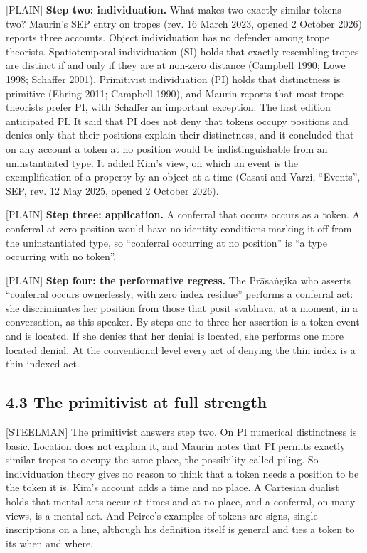 \documentclass[11pt]{article}
\newcommand{\register}[1]{{\ttfamily\small #1}}
\begin{document}
\register{[PLAIN]} \textbf{Step two: individuation.} What makes two exactly similar tokens two? Maurin's SEP entry on tropes (rev. 16 March 2023, opened 2 October 2026) reports three accounts. Object individuation has no defender among trope theorists. Spatiotemporal individuation (SI) holds that exactly resembling tropes are distinct if and only if they are at non-zero distance (Campbell 1990; Lowe 1998; Schaffer 2001). Primitivist individuation (PI) holds that distinctness is primitive (Ehring 2011; Campbell 1990), and Maurin reports that most trope theorists prefer PI, with Schaffer an important exception. The first edition anticipated PI. It said that PI does not deny that tokens occupy positions and denies only that their positions explain their distinctness, and it concluded that on any account a token at no position would be indistinguishable from an uninstantiated type. It added Kim's view, on which an event is the exemplification of a property by an object at a time (Casati and Varzi, ``Events'', SEP, rev. 12 May 2025, opened 2 October 2026).

\register{[PLAIN]} \textbf{Step three: application.} A conferral that occurs occurs as a token. A conferral at zero position would have no identity conditions marking it off from the uninstantiated type, so ``conferral occurring at no position'' is ``a type occurring with no token''.

\register{[PLAIN]} \textbf{Step four: the performative regress.} The Prāsaṅgika who asserts ``conferral occurs ownerlessly, with zero index residue'' performs a conferral act: she discriminates her position from those that posit svabhāva, at a moment, in a conversation, as this speaker. By steps one to three her assertion is a token event and is located. If she denies that her denial is located, she performs one more located denial. At the conventional level every act of denying the thin index is a thin-indexed act.

\subsection*{4.3 The primitivist at full strength}

\register{[STEELMAN]} The primitivist answers step two. On PI numerical distinctness is basic. Location does not explain it, and Maurin notes that PI permits exactly similar tropes to occupy the same place, the possibility called piling. So individuation theory gives no reason to think that a token needs a position to be the token it is. Kim's account adds a time and no place. A Cartesian dualist holds that mental acts occur at times and at no place, and a conferral, on many views, is a mental act. And Peirce's examples of tokens are signs, single inscriptions on a line, although his definition itself is general and ties a token to its when and where.
\end{document}
